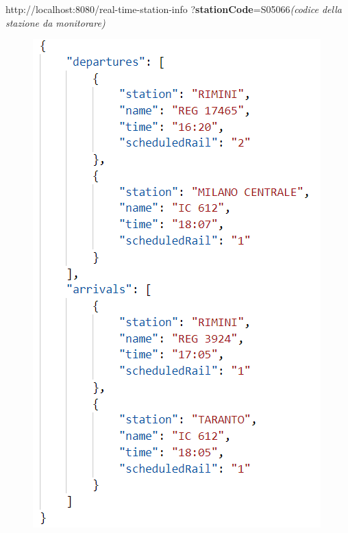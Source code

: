 \begin{itemize}
\begin{info}
    http://localhost:8080/real-time-station-info\newline
    ?\textbf{stationCode}=S05066\hfill\emph{(codice della stazione da monitorare)}
    \end{info}

    \begin{figure}[H]
    	\begin{center}
    		\includegraphics{img/real-time-station-info-json.png}
    		\label{fig:real-time-station-info}
    	\end{center}
    \end{figure}

\end{itemize}
